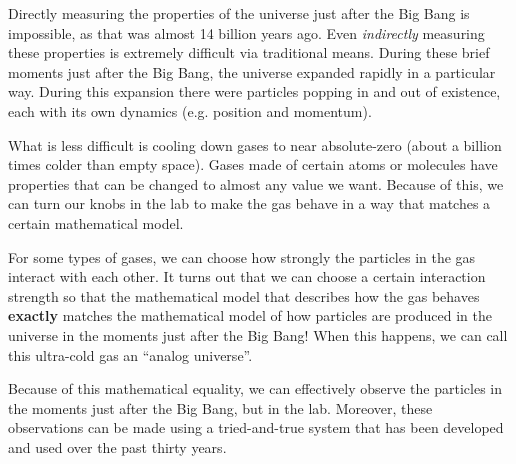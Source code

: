 \documentclass{article}
\begin{document}
    Directly measuring the properties of the universe just after the Big Bang is impossible, as that was almost 14 billion years ago.  Even \emph{indirectly} measuring these properties is extremely difficult via traditional means.  During these brief moments just after the Big Bang, the universe expanded rapidly in a particular way.  During this expansion there were particles popping in and out of existence, each with its own dynamics (e.g. position and momentum).

    What is less difficult is cooling down gases to near absolute-zero (about a billion times colder than empty space).  Gases made of certain atoms or molecules have properties that can be changed to almost any value we want.  Because of this, we can turn our knobs in the lab to make the gas behave in a way that matches a certain mathematical model.
    
    For some types of gases, we can choose how strongly the particles in the gas interact with each other.  It turns out that we can choose a certain interaction strength so that the mathematical model that describes how the gas behaves \textbf{exactly} matches the mathematical model of how particles are produced in the universe in the moments just after the Big Bang!  When this happens, we can call this ultra-cold gas an ``analog universe''.

    Because of this mathematical equality, we can effectively observe the particles in the moments just after the Big Bang, but in the lab. Moreover, these observations can be made using a tried-and-true system that has been developed and used over the past thirty years\cite{firstBEC}.
    
\end{document}
